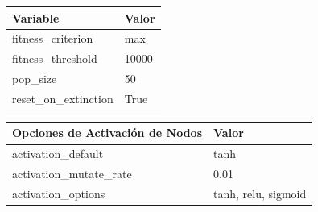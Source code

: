 \documentclass[lettersize, journal]{IEEEtran}
\begin{document}
\begin{table}[H]
    \centering
    \label{tab:NEAT_1}
    \begin{tabular}{ll}
    \toprule
    \textbf{Variable} & \textbf{Valor} \\
    \midrule
    fitness\_criterion     & max \\
    fitness\_threshold     & 10000 \\
    pop\_size              & 50 \\
    reset\_on\_extinction  & True  \\
    \bottomrule
    \end{tabular}
    \vspace{0.5cm}
    

    \label{tab:DefaultGenome_1}
    \begin{tabular}{ll}
    \toprule
    \textbf{Opciones de Activación de Nodos} & \textbf{Valor} \\
    \midrule
    activation\_default       & tanh \\
    activation\_mutate\_rate  & 0.01 \\
    activation\_options       & tanh, relu, sigmoid \\
    \bottomrule
    \end{tabular}

\end{table}

    
\end{document}
